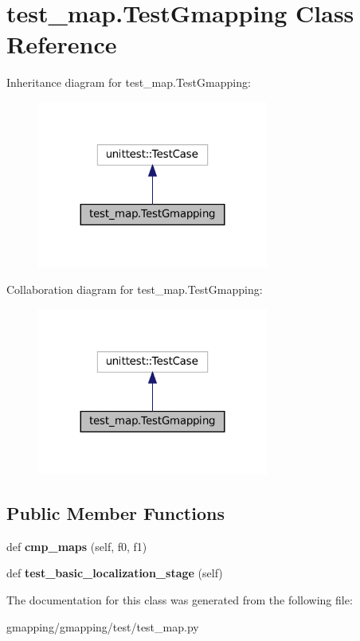 \hypertarget{classtest__map_1_1TestGmapping}{}\section{test\+\_\+map.\+Test\+Gmapping Class Reference}
\label{classtest__map_1_1TestGmapping}


Inheritance diagram for test\+\_\+map.\+Test\+Gmapping\+:
\nopagebreak
\begin{figure}[H]
\begin{center}
\leavevmode
\includegraphics[width=215pt]{classtest__map_1_1TestGmapping__inherit__graph}
\end{center}
\end{figure}


Collaboration diagram for test\+\_\+map.\+Test\+Gmapping\+:
\nopagebreak
\begin{figure}[H]
\begin{center}
\leavevmode
\includegraphics[width=215pt]{classtest__map_1_1TestGmapping__coll__graph}
\end{center}
\end{figure}
\subsection*{Public Member Functions}
\begin{DoxyCompactItemize}
\item 
\mbox{\label{classtest__map_1_1TestGmapping_a498c46e9ad118d86172df4e87b4fa744}} 
def {\bfseries cmp\+\_\+maps} (self, f0, f1)
\item 
\mbox{\label{classtest__map_1_1TestGmapping_af2799c4c3a3b5cbe1e9b1702ae7c72f3}} 
def {\bfseries test\+\_\+basic\+\_\+localization\+\_\+stage} (self)
\end{DoxyCompactItemize}


The documentation for this class was generated from the following file\+:\begin{DoxyCompactItemize}
\item 
gmapping/gmapping/test/test\+\_\+map.\+py\end{DoxyCompactItemize}
